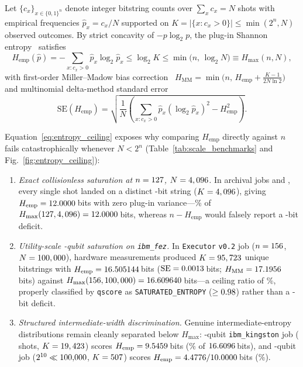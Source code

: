 \documentclass[twocolumn,aps,prapplied,superscriptaddress,floatfix]{revtex4-2}
\begin{document}
Let $\{c_x\}_{x \in \{0,1\}^n}$ denote integer bitstring counts over $\sum_x c_x = N$ shots with empirical frequencies $\hat{p}_x = c_x / N$ supported on $K = \lvert\{x : c_x > 0\}\rvert \le \min(2^n, N)$ observed outcomes. By strict concavity of $-p \log_2 p$, the plug-in Shannon entropy~\cite{shannon1948,paninski2003} satisfies
\begin{equation}
H_{\mathrm{emp}}(\hat{p}) = -\sum_{x : c_x > 0} \hat{p}_x \log_2 \hat{p}_x \le \log_2 K \le \min\!\bigl(n,\, \log_2 N\bigr) \equiv H_{\max}(n, N),
\label{eq:entropy_ceiling}
\end{equation}
with first-order Miller--Madow bias correction~\cite{miller1955} $H_{\mathrm{MM}} = \min\!\bigl(n,\, H_{\mathrm{emp}} + \frac{K-1}{2N\ln 2}\bigr)$ and multinomial delta-method standard error
\begin{equation}
\mathrm{SE}(H_{\mathrm{emp}}) = \sqrt{\frac{1}{N}\!\left(\sum_{x : c_x > 0} \hat{p}_x (\log_2 \hat{p}_x)^2 - H_{\mathrm{emp}}^2\right)}.
\label{eq:delta_se}
\end{equation}

Equation~\eqref{eq:entropy_ceiling} exposes why comparing $H_{\mathrm{emp}}$ directly against $n$ fails catastrophically whenever $N < 2^n$ (Table~\ref{tab:scale_benchmarks} and Fig.~\ref{fig:entropy_ceiling}):
\begin{enumerate}
\item \emph{Exact collisionless saturation at $n=127$, $N=4,096$.} In archival jobs \texttt{\QdArchWideJobA} and \texttt{\QdArchWideJobB}, every single shot landed on a distinct \QdArchWideBits{}-bit string ($K = 4,096$), giving $H_{\mathrm{emp}} = 12.0000$\,bits with zero plug-in variance—\QdArchWideRatioPct\% of $H_{\max}(127, 4,096) = 12.0000$\,bits, whereas $n - H_{\mathrm{emp}}$ would falsely report a \QdArchNaiveDeficit-bit deficit.
\item \emph{Utility-scale \QdFezWideBits{}-qubit saturation on \texttt{ibm\_fez}.} In \texttt{Executor} \texttt{v0.2} job \texttt{\QdFezWideJobId} ($n=156$, $N=100,000$), hardware measurements produced $K = 95,723$ unique bitstrings with $H_{\mathrm{emp}} = 16.505144$\,bits ($\mathrm{SE} = 0.0013$\,bits; $H_{\mathrm{MM}} = 17.1956$\,bits) against $H_{\max}(156, 100,000) = 16.609640$\,bits—a ceiling ratio of \QdFezWideRatioPct\%, properly classified by \texttt{qscore} as \texttt{SATURATED\_ENTROPY} ($\ge 0.98$) rather than a \QdFezNaiveDeficit-bit deficit.
\item \emph{Structured intermediate-width discrimination.} Genuine intermediate-entropy distributions remain cleanly separated below $H_{\max}$: \QdKingFortyBits{}-qubit \texttt{ibm\_kingston} job \texttt{\QdKingFortyJobId} (\QdExecShotsEach{} shots, $K=19,423$) scores $H_{\mathrm{emp}} = 9.5459$\,bits (\QdKingFortyRatioPct\% of $16.6096$\,bits), and \QdKingTenBits{}-qubit job \texttt{\QdKingTenJobId} ($2^{10} \ll 100{,}000$, $K=507$) scores $H_{\mathrm{emp}} = 4.4776/10.0000$\,bits (\QdKingTenRatioPct\%).
\end{enumerate}
\end{document}
